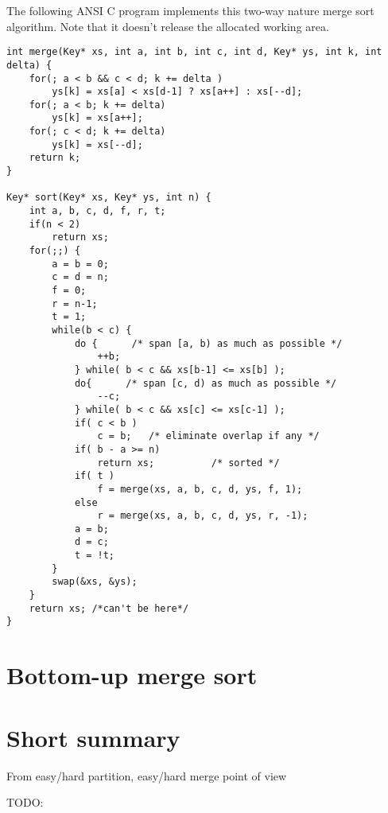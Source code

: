 \documentclass{article}
\begin{document}
The following ANSI C program implements this two-way nature merge sort algorithm. Note that it
doesn't release the allocated working area.

\lstset{language=C}
\begin{lstlisting}
int merge(Key* xs, int a, int b, int c, int d, Key* ys, int k, int delta) {
    for(; a < b && c < d; k += delta )
        ys[k] = xs[a] < xs[d-1] ? xs[a++] : xs[--d];
    for(; a < b; k += delta)
        ys[k] = xs[a++];
    for(; c < d; k += delta)
        ys[k] = xs[--d];
    return k;
}

Key* sort(Key* xs, Key* ys, int n) {
    int a, b, c, d, f, r, t;
    if(n < 2)
        return xs;
    for(;;) {
        a = b = 0;
        c = d = n;
        f = 0;
        r = n-1;
        t = 1;
        while(b < c) {
            do {      /* span [a, b) as much as possible */
                ++b;
            } while( b < c && xs[b-1] <= xs[b] );
            do{      /* span [c, d) as much as possible */
                --c;
            } while( b < c && xs[c] <= xs[c-1] );
            if( c < b )
                c = b;   /* eliminate overlap if any */
            if( b - a >= n) 
                return xs;          /* sorted */
            if( t )
                f = merge(xs, a, b, c, d, ys, f, 1);
            else
                r = merge(xs, a, b, c, d, ys, r, -1);
            a = b;
            d = c;
            t = !t;
        } 
        swap(&xs, &ys);
    }
    return xs; /*can't be here*/
}
\end{lstlisting}

\section{Bottom-up merge sort}

\section{Short summary} 
From easy/hard partition, easy/hard merge point of view

TODO:
\end{document}
